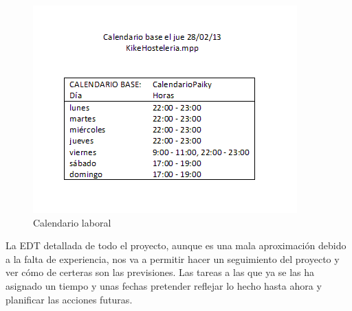 \documentclass[spanish,a4paper,11pt, twoside]{report}	%
\begin{document}
	\begin{figure}[!h]
	\centering
	\includegraphics[scale=0.8]{Calendario.png}
	\vspace{-1.25 true cm}
	\caption{Calendario laboral}
	\end{figure}



	La EDT detallada de todo el proyecto, aunque es una mala aproximación debido a la falta de experiencia,
	nos va a permitir hacer un seguimiento del proyecto y ver cómo de certeras son las previsiones. Las tareas
	a las que ya se las ha asignado un tiempo y unas fechas pretender reflejar lo hecho hasta ahora y planificar 
	las acciones futuras.
	
	\newpage
\end{document}
